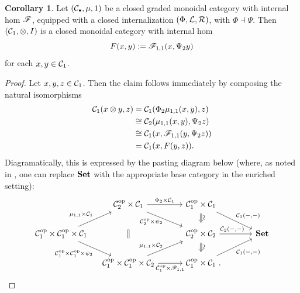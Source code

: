 \documentclass[openany, amssymb, psamsfonts]{amsart}
\theoremstyle{definition}
\newtheorem{cor}{Corollary}[section]
\numberwithin{equation}{section}
\begin{document}
\begin{cor} \label{cor:closed_internalization}
Let $(\C_\sbull, \mu, 1)$ be a closed graded monoidal category with internal hom $\mathscr{F}$, equipped with a closed internalization $(\Phi, \mathcal{L}, \mathcal{R})$, with $\Phi \dashv \Psi$. Then $(\mathcal{C}_1, \otimes, I)$ is a closed monoidal category with internal hom
\begin{equation*}
    F(x, y) := \mathscr{F}_{1, 1}(x, \Psi_2 y)
\end{equation*} for each $x, y \in \mathcal{C}_1$.
\end{cor}
\begin{proof}
Let $x, y, z \in \mathcal{C}_1$. Then the claim follows immediately by composing the natural isomorphisms
\begin{align*}
     \mathcal{C}_1(x \otimes y, z) &= \mathcal{C}_1(\Phi_2\mu_{1, 1}(x, y), z)\\
     &\cong \mathcal{C}_2(\mu_{1, 1}(x, y), \Psi_2 z)\\
     &\cong \mathcal{C}_1(x, \mathscr{F}_{1, 1}(y, \Psi_2 z))\\
     &= \mathcal{C}_1(x, F(y, z)).
\end{align*} Diagramatically, this is expressed by the pasting diagram below (where, as noted in , one can replace $\textbf{\textup{Set}}$ with the appropriate base category in the enriched setting):
\begin{equation*}
    \begin{tikzcd}[column sep = 3em, /tikz/column 3/.style={column sep=4em}, /tikz/column 1/.style={column sep=1em}]
        & \C_2^\op \times \C_1 \ar[r, "\Phi_2 \times \C_1"] \ar[dr, "\C_2^\op \times \psi_2"'{yshift = 0.7ex}] \ar[dd, equals, shorten <= 5ex, shorten >= 5ex] & \C_1^\op \times \C_1 \ar[dr, "{\C_1(-, -)}"] \ar[d, Rightarrow, shorten <= 0.5ex, shorten >= 1ex, "\sim" {rotate = 90, yshift = -1ex, xshift = -0.8ex}] \\
        \C_1^\op \times \C_1^\op \times \C_1 \ar[ur, "\mu_{1, 1} \times \C_1"] \ar[dr, "\C_1^\op \times \C_1^\op \times \psi_2"'] && \C_2^\op \times \C_2 \ar[r, "{\C_2(-, -)}"{xshift = -1ex}] \ar[d, Rightarrow, shorten <= 0.5ex, shorten >= 1ex, "\sim" {rotate = 90, yshift = -1ex, xshift = -0.8ex}] & \Set\\
        & \C_1^\op \times \C_1^\op \times \C_2 \ar[ur, "\mu_{1, 1} \times \C_2"{yshift = -0.5ex}] \ar[r, "\C_1^\op \times \scF_{1,1}"'] & \C_1^\op \times \C_1 \period \ar[ur, "{\C_1(-, -)}"']
    \end{tikzcd}
\end{equation*}
\end{proof}
\end{document}
